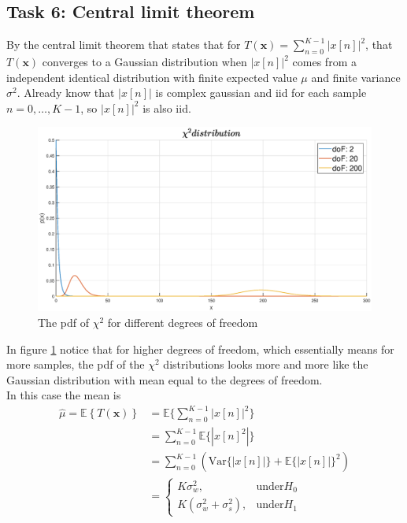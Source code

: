 \subsection{Task 6: Central limit theorem}
By the central limit theorem that states that for $T(\mathbf{x}) = \sum_{n=0}^{K-1}|x[n]|^2$, that $T(\mathbf{x})$ converges to a Gaussian distribution when $|x[n]|^2$ comes from a independent identical distribution with finite expected value $\mu$ and finite variance $\sigma^2$. Already know that $|x[n]|$ is complex gaussian and iid for each sample $n = 0, \dots, K-1$, so $|x[n]|^2$ is also iid.\\
\begin{figure}
    \centering
    \includegraphics[width=\textwidth]{figures/chi_square.eps}
    \caption{The pdf of $\chi^2$ for different degrees of freedom}
    \label{fig:chitogauss}
\end{figure}
In figure \ref{fig:chitogauss} notice that for higher degrees of freedom, which essentially means for more samples, the pdf of the $\chi^2$ distributions looks more and more like the Gaussian distribution with mean equal to the degrees of freedom.\\
In this case the mean is
\begin{align}
    \hat{\mu} = \mathbb{E}\left\{T(\mathbf{x})\right\} & = \mathbb{E}\{\sum_{n=0}^{K-1}|x[n]|^2\}\nonumber\\
    & = \sum_{n=0}^{K-1}\mathbb{E}\{|x[n]^2|\}\nonumber\\
    & = \sum_{n=0}^{K-1}(\text{Var}\{|x[n]|\}+\mathbb{E}\{|x[n]|\}^2)\nonumber\\
    & = \begin{cases}
    K\sigma_w^2, & \text{under} H_0\\
    K(\sigma_w^2+\sigma_s^2), & \text{under} H_1
    \end{cases}
\end{align}
